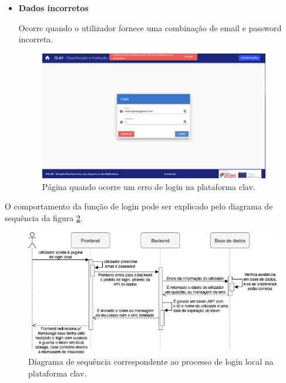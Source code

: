 \begin{itemize}
\begin{itemize}
        \item \textbf{Dados incorretos}
        
        Ocorre quando o utilizador fornece uma combinação de email e password incorreta.
        
        \begin{figure}[h!]
            \centering
            \includegraphics[width=0.95\textwidth]{img/clav/authlocal/erroLogin2.png}
            \caption{Página quando ocorre um erro de login na plataforma \gls{clav}.}
            \label{fig:loginErro2}
        \end{figure}
    \end{itemize}
\end{itemize}

O comportamento da função de login pode ser explicado pelo diagrama de sequência da figura \ref{fig:diagramaLogin}.

\begin{figure}[h!]
    \centering
    \includegraphics[width=\textwidth]{img/diagramas/sequencia/DiagramasSequencia-Login.png}
    \caption{Diagrama de sequência correspondente ao processo de login local na plataforma \gls{clav}.}
    \label{fig:diagramaLogin}
\end{figure}

